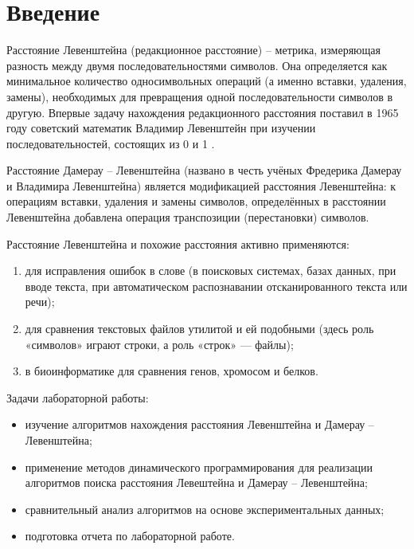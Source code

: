 \chapter*{Введение}

Расстояние Левенштейна (редакционное расстояние) -- метрика, измеряющая разность между двумя последовательностями символов. Она определяется как минимальное количество односимвольных операций (а именно вставки, удаления, замены), необходимых для превращения одной последовательности символов в другую. Впервые задачу нахождения редакционного расстояния поставил в 1965 году советский математик Владимир Левенштейн при изучении последовательностей, состоящих из  0 и 1 \cite{bib1}.

Расстояние Дамерау -- Левенштейна (названо в честь учёных Фредерика Дамерау и Владимира Левенштейна) является модификацией расстояния Левенштейна: к операциям вставки, удаления и замены символов, определённых в расстоянии Левенштейна добавлена операция транспозиции (перестановки) символов.

Расстояние Левенштейна и похожие расстояния активно применяются: 
\begin{enumerate}[label={\arabic*)}]
	\item для исправления ошибок в слове (в поисковых системах, базах данных, при вводе текста, при автоматическом распознавании отсканированного текста или речи);
	\item для сравнения текстовых файлов утилитой  и ей подобными (здесь роль «символов» играют строки, а роль «строк» — файлы);
	\item в биоинформатике для сравнения генов, хромосом и белков.
\end{enumerate}


Задачи лабораторной работы:

\begin{itemize}
	\item изучение алгоритмов нахождения расстояния Левенштейна и Дамерау -- Левенштейна;
	\item применение методов динамического программирования для реализации алгоритмов поиска расстояния Левештейна и Дамерау -- Левенштейна;
	\item сравнительный анализ алгоритмов на основе экспериментальных данных;
	\item подготовка отчета по лабораторной работе.
\end{itemize}

